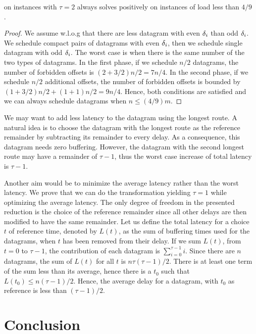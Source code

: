 \begin{theorem}
\compactpair on instances with $\tau =2$ always solves \pma positively on instances of load less than $4/9$.
\end{theorem}
\begin{proof}
We assume w.l.o.g that there are less datagram with even $\delta_i$ than odd $\delta_i$.
We schedule compact pairs of datagrams with even $\delta_i$, then we schedule single datagram with odd $\delta_i$. The worst case is when there is the same number of the two types of datagrams. In the first phase, if we schedule
 $n/2$ datagrams, the number of forbidden offsets is $(2 + 3/2)n/2 = 7n/4$. In the second phase,
 if we schedule $n/2$ additional offsets, the number of forbidden offsets is bounded by 
$ (1 + 3/2) n/2  + (1 + 1)n/2 = 9n/4$. 
Hence, both conditions are satisfied and we can always schedule datagrams when $n \leq (4/9)m$.
\end{proof}

We may want to add less latency to the datagram using the longest route. A natural idea is to choose the datagram with the longest route as the reference remainder by subtracting its remainder to every delay.
As a consequence, this datagram needs zero buffering. However, the datagram with the second longest route may have a remainder of $\tau -1$, thus the worst case increase of total latency is $\tau -1$. 

Another aim would be to minimize the average latency rather than the worst latency.
We prove that we can do the transformation yielding $\tau=1$ while optimizing the average latency. 
 The only degree of freedom in the presented reduction is the choice of the reference remainder since all other delays are then modified to have the same remainder. Let us define the total latency for a choice $t$ of reference time, denoted by $L(t)$, as the sum of buffering times used for the datagrams, when $t$ has been removed from their delay.
If we sum $L(t)$, from $t=0$ to $\tau-1$, the contribution of each datagram is $\sum_{i=0}^{\tau-1} i$. Since there are $n$ datagrams, the sum of $L(t)$ for all $t$ is $n \tau (\tau-1)/2$. There is at least one term of the sum less than its average,
hence there is a $t_0$ such that $L(t_0) \leq n (\tau-1)/2$. Hence, the average delay for a datagram, with $t_0$ as reference is less than $(\tau -1)/2$.


\section{Conclusion}

